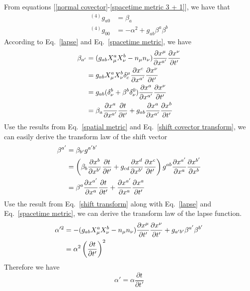 \documentclass[letterpaper,nofootinbib,prd,amsmath,onecolumn]{revtex4-1}
\begin{document}
From equations [\ref{normal covector}-\ref{spacetime metric 3 + 1}], we have that
\begin{align}
^{(4)}g_{a0} & = \beta_{a}\label{lapse}\\
^{(4)}g_{00} & = -\alpha^2 + g_{ab}\beta^{a}\beta^{b}\label{shift}
\end{align}
According to Eq.~\ref{lapse} and Eq.~\ref{spacetime metric}, we have
\begin{align}
\beta_{a'} & = (g_{ab}X^{a}_{\mu}X^{b}_{\nu} - n_{\mu}n_{\nu})\frac{\partial x^{\mu}}{\partial x^{a'}}\frac{\partial x^{\nu}}{\partial t'}\notag\\
& = g_{ab}X^{a}_{\mu}X^{b}_{\nu}\delta_{c}^{\mu}\frac{\partial x^{c}}{\partial x^{a'}}\frac{\partial x^{\nu}}{\partial t'}\notag\\
& = g_{ab}(\delta^{b}_{\nu} + \beta^{b}\delta^{0}_{\nu})\frac{\partial x^{a}}{\partial x^{a'}}\frac{\partial x^{\nu}}{\partial t'}\notag\\
& = \beta_{a}\frac{\partial x^{a}}{\partial x^{a'}}\frac{\partial t}{\partial t'} + g_{ab}\frac{\partial x^{a}}{\partial x^{a'}}\frac{\partial x^{b}}{\partial t'}\label{shift covector transform}
\end{align}
Use the results from Eq.~\ref{spatial metric} and Eq.~\ref{shift covector transform}, we can easily derive the transform law of the shift vector
\begin{align}
\beta^{a'} & = \beta_{b'}g^{a'b'}\notag\\
& = \left(\beta_{b}\frac{\partial x^{b}}{\partial x^{b'}}\frac{\partial t}{\partial t'} + g_{cd}\frac{\partial x^{d}}{\partial x^{b'}}\frac{\partial x^{c}}{\partial t'}\right)g^{ab}\frac{\partial x^{a'}}{\partial x^{a}}\frac{\partial x^{b'}}{\partial x^{b}}\notag\\
& = \beta^{a}\frac{\partial x^{a'}}{\partial x^{a}}\frac{\partial t}{\partial t'} + \frac{\partial x^{a'}}{\partial x^{a}}\frac{\partial x^{a}}{\partial t'}
\end{align}
Use the result from Eq.~\ref{shift transform} along with Eq.~\ref{lapse} and Eq.~\ref{spacetime metric}, we can derive the transform law of the lapse function. 
\begin{align*}
\alpha'^{2} & = - (g_{ab}X^{a}_{\mu}X^{b}_{\nu} - n_{\mu}n_{\nu})\frac{\partial x^{\mu}}{\partial t'}\frac{\partial x^{\nu}}{\partial t'} + g_{a'b'}\beta^{a'}\beta^{b'}\notag\\ 
& = \alpha^2\left(\frac{\partial t}{\partial t'}\right)^{2}
\end{align*}
Therefore we have
\begin{equation}
\alpha' = \alpha\frac{\partial t}{\partial t'}\label{lapse transform}
\end{equation}
\section{}\label{gauge}
\section{}\label{example}
\end{document}
